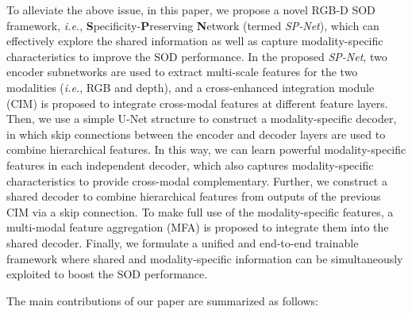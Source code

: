 \documentclass[10pt,twocolumn,letterpaper]{article}
\def\ie{\emph{i.e.}}
\def\ours{\emph{SP-Net}}
\begin{document}
To alleviate the above issue, in this paper, we propose a novel RGB-D SOD framework, \ie, \textbf{S}pecificity-\textbf{P}reserving \textbf{N}etwork (termed \ours), which can effectively explore the shared information as well as capture modality-specific characteristics to improve the SOD performance. In the proposed \ours, two encoder subnetworks are used to extract multi-scale features for the two modalities (\ie, RGB and depth), and a cross-enhanced integration module (CIM) is proposed to integrate cross-modal features at different feature layers. Then, we use a simple U-Net \cite{ronneberger2015u} structure to construct a modality-specific decoder, in which skip connections between the encoder and decoder layers are used to combine hierarchical features. In this way, we can learn powerful modality-specific features in each independent decoder, which also captures modality-specific characteristics to provide cross-modal complementary. Further, we construct a shared decoder to combine hierarchical features from outputs of the previous CIM via a skip connection. To make full use of the modality-specific features, a multi-modal feature aggregation (MFA) is proposed to integrate them into the shared decoder. Finally, we formulate a unified and end-to-end trainable framework where shared and modality-specific information can be simultaneously exploited to boost the SOD performance.


The main contributions of our paper are summarized as follows:
\end{document}
